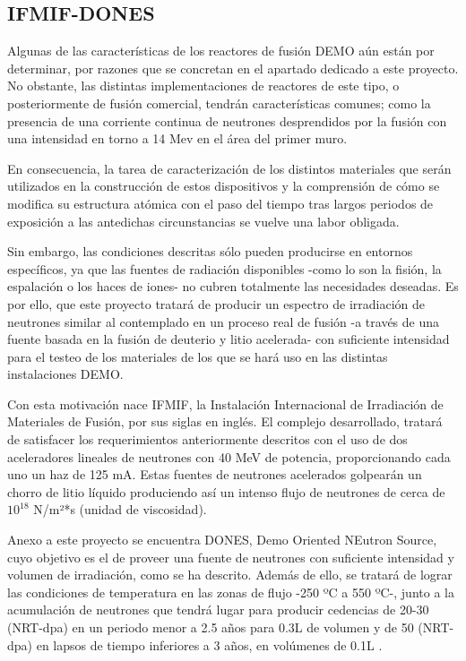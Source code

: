 \subsection{ IFMIF-DONES}
Algunas de las características de los reactores de fusión DEMO aún están por determinar, por razones que se concretan en el apartado dedicado a este proyecto. No obstante, las distintas implementaciones de reactores de este tipo, o posteriormente de fusión comercial, tendrán características comunes; como la presencia de una corriente continua de neutrones desprendidos por la fusión con una intensidad en torno a 14 Mev en el área del primer muro.

En consecuencia, la tarea de caracterización de los distintos materiales que serán utilizados en la construcción de estos dispositivos y la comprensión de cómo se modifica su estructura atómica con el paso del tiempo tras largos periodos de exposición a las antedichas circunstancias se vuelve una labor obligada.

Sin embargo, las condiciones descritas sólo pueden producirse en entornos específicos, ya que las fuentes de radiación disponibles -como lo son la fisión,  la espalación o los haces de iones- no cubren totalmente las necesidades deseadas. Es por ello, que este proyecto tratará de producir un espectro de irradiación de neutrones similar al contemplado en un proceso real de fusión -a través de una fuente basada en la fusión de deuterio y litio acelerada- con suficiente intensidad para el testeo de los materiales de los que se hará uso en las distintas instalaciones DEMO.

Con esta motivación nace IFMIF, la Instalación Internacional de Irradiación de  Materiales de  Fusión, por sus siglas en inglés. El complejo desarrollado, tratará de satisfacer los requerimientos anteriormente descritos con el uso de dos aceleradores lineales de neutrones con 40 MeV de potencia, proporcionando cada uno un haz de 125 mA. Estas fuentes de neutrones acelerados golpearán un chorro de litio líquido produciendo así un intenso flujo de neutrones de cerca de $10^{18}$ N/m²*s (unidad de viscosidad).

Anexo a este proyecto se encuentra DONES, Demo Oriented NEutron Source, cuyo objetivo es el de proveer una fuente de neutrones con suficiente intensidad y volumen de irradiación, como se ha descrito. Además de ello, se tratará de lograr las condiciones de temperatura en las zonas de flujo -250 ºC a 550 ºC-, junto a la acumulación de neutrones que tendrá lugar para producir cedencias de 20-30 (NRT-dpa) en un periodo menor a 2.5 años para 0.3L de volumen y de 50 (NRT-dpa) en lapsos de tiempo inferiores a 3 años, en volúmenes de 0.1L \cite{46}.


